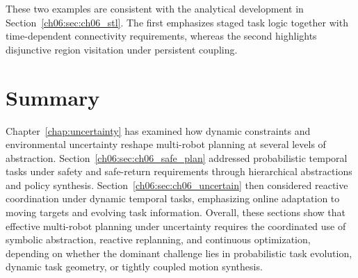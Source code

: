 These two examples are consistent with the analytical development in
Section~\ref{ch06:sec:ch06_stl}. The first emphasizes staged task logic
together with time-dependent connectivity requirements, whereas the
second highlights disjunctive region visitation under persistent
coupling. 



\section{Summary}
\label{sec:ch06_summary}

Chapter~\ref{chap:uncertainty} has examined how dynamic constraints and
environmental uncertainty reshape multi-robot planning at several
levels of abstraction.
Section~\ref{ch06:sec:ch06_safe_plan} addressed probabilistic temporal
tasks under safety and safe-return requirements through hierarchical
abstractions and policy synthesis.
Section~\ref{ch06:sec:ch06_uncertain} then considered reactive
coordination under dynamic temporal tasks, emphasizing online adaptation
to moving targets and evolving task information.
Overall, these sections show that effective multi-robot planning
under uncertainty requires the coordinated use of symbolic abstraction,
reactive replanning, and continuous optimization, depending on whether
the dominant challenge lies in probabilistic task evolution, dynamic
task geometry, or tightly coupled motion synthesis.
